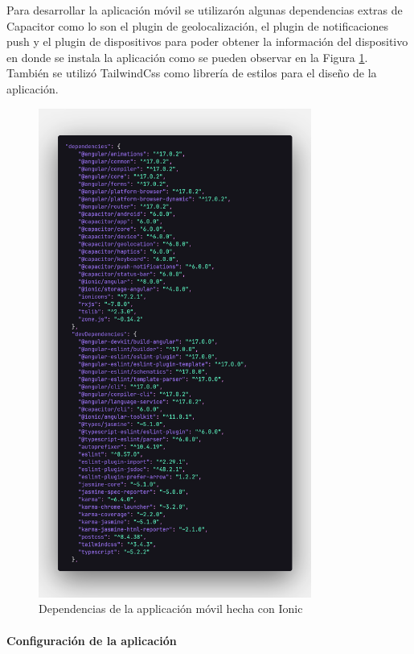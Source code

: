 Para desarrollar la aplicación móvil se utilizarón algunas dependencias extras de Capacitor como lo son el plugin de geolocalización, el plugin de notificaciones push y el plugin de dispositivos para poder obtener la información del dispositivo en donde se instala la aplicación como se pueden observar en la Figura \ref{fig:app-dependencias}.
También se utilizó TailwindCss como librería de estilos para el diseño de la aplicación.
\begin{figure}[H]
    \centering
    \includegraphics[width=0.8\textwidth]{resources/images/app-dependencias}
    \caption{Dependencias de la applicación móvil hecha con Ionic}
    \label{fig:app-dependencias}
\end{figure}

\paragraph{Configuración de la aplicación}

